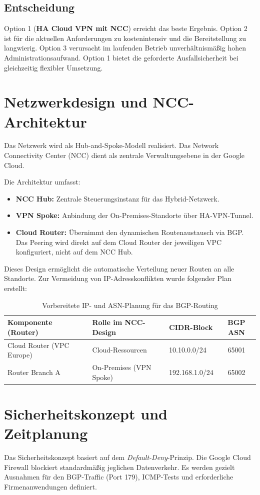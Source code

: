 \subsection*{Entscheidung} 
Option 1 (\textbf{HA Cloud VPN mit NCC}) erreicht das beste Ergebnis. Option 2 ist für die aktuellen Anforderungen zu kostenintensiv und die Bereitstellung zu langwierig. Option 3 verursacht im laufenden Betrieb unverhältnismäßig hohen Administrationsaufwand. Option 1 bietet die geforderte Ausfallsicherheit bei gleichzeitig flexibler Umsetzung.

\section{Netzwerkdesign und NCC-Architektur}
Das Netzwerk wird als Hub-and-Spoke-Modell realisiert. Das Network Connectivity Center (NCC) dient als zentrale Verwaltungsebene in der Google Cloud. 

Die Architektur umfasst:
\begin{itemize}
    \item \textbf{NCC Hub:} Zentrale Steuerungsinstanz für das Hybrid-Netzwerk.
    \item \textbf{VPN Spoke:} Anbindung der On-Premises-Standorte über HA-VPN-Tunnel.
    \item \textbf{Cloud Router:} Übernimmt den dynamischen Routenaustausch via BGP. Das Peering wird direkt auf dem Cloud Router der jeweiligen VPC konfiguriert, nicht auf dem NCC Hub.
\end{itemize}

Dieses Design ermöglicht die automatische Verteilung neuer Routen an alle Standorte. Zur Vermeidung von IP-Adresskonflikten wurde folgender Plan erstellt:

\begin{table}[!ht]
\centering
\begin{tabularx}{\textwidth}{|X|X|l|c|}
\hline
\textbf{Komponente (Router)} & \textbf{Rolle im NCC-Design} & \textbf{CIDR-Block} & \textbf{BGP ASN} \\ \hline
Cloud Router (VPC Europe) & Cloud-Ressourcen & 10.10.0.0/24 & 65001 \\ \hline
Router Branch A & On-Premises (VPN Spoke) & 192.168.1.0/24 & 65002 \\ \hline
\end{tabularx}
\caption{Vorbereitete IP- und ASN-Planung für das BGP-Routing}
\end{table}

\section{Sicherheitskonzept und Zeitplanung}
Das Sicherheitskonzept basiert auf dem \textit{Default-Deny}-Prinzip. Die Google Cloud Firewall blockiert standardmäßig jeglichen Datenverkehr. Es werden gezielt Ausnahmen für den BGP-Traffic (Port 179), ICMP-Tests und erforderliche Firmenanwendungen definiert.

